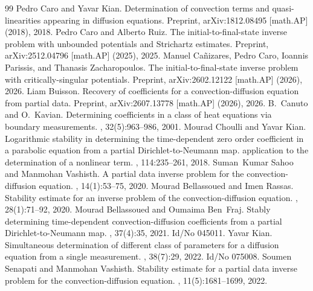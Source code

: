 \documentclass[10pt,a4paper]{amsart}
\begin{document}
\begin{thebibliography}{99}
 Pedro Caro and Yavar Kian. \newblock Determination of convection terms and quasi-linearities appearing in diffusion equations. \newblock Preprint, {arXiv}:1812.08495 [math.{AP}] (2018), 2018.
 Pedro Caro and Alberto Ruiz. \newblock The initial-to-final-state inverse problem with unbounded potentials and {Strichartz} estimates. \newblock Preprint, {arXiv}:2512.04796 [math.{AP}] (2025), 2025.
 Manuel Ca{\~n}izares, Pedro Caro, Ioannis Parissis, and Thanasis Zacharopoulos. \newblock The initial-to-final-state inverse problem with critically-singular potentials. \newblock Preprint, {arXiv}:2602.12122 [math.{AP}] (2026), 2026.
 Liam Buisson. \newblock Recovery of coefficients for a convection-diffusion equation from partial data. \newblock Preprint, {arXiv}:2607.13778 [math.{AP}] (2026), 2026.
 B.~Canuto and O.~Kavian. \newblock Determining coefficients in a class of heat equations via boundary measurements. , 32(5):963--986, 2001.
 Mourad Choulli and Yavar Kian. \newblock Logarithmic stability in determining the time-dependent zero order coefficient in a parabolic equation from a partial {Dirichlet}-to-{Neumann} map. application to the determination of a nonlinear term. , 114:235--261, 2018.
 Suman~Kumar Sahoo and Manmohan Vashisth. \newblock A partial data inverse problem for the convection-diffusion equation. , 14(1):53--75, 2020.
 Mourad Bellassoued and Imen Rassas. \newblock Stability estimate for an inverse problem of the convection-diffusion equation. , 28(1):71--92, 2020.
 Mourad Bellassoued and Oumaima Ben~Fraj. \newblock Stably determining time-dependent convection-diffusion coefficients from a partial {Dirichlet}-to-{Neumann} map. , 37(4):35, 2021. \newblock Id/No 045011.
 Yavar Kian. \newblock Simultaneous determination of different class of parameters for a diffusion equation from a single measurement. , 38(7):29, 2022. \newblock Id/No 075008.
 Soumen Senapati and Manmohan Vashisth. \newblock Stability estimate for a partial data inverse problem for the convection-diffusion equation. , 11(5):1681--1699, 2022.

\end{thebibliography}
\end{document}

